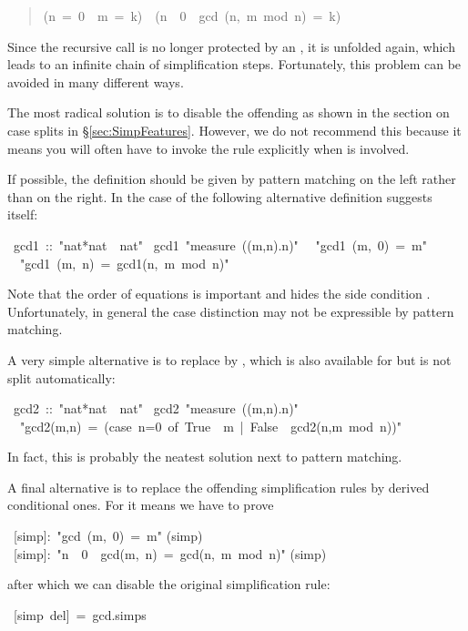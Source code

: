 \begin{isabelle}
\begin{isamarkuptext}
\begin{quote}
\begin{isabelle}%
(n\ =\ 0\ {\isasymlongrightarrow}\ m\ =\ k)\ {\isasymand}\ (n\ {\isasymnoteq}\ 0\ {\isasymlongrightarrow}\ gcd\ (n,\ m\ mod\ n)\ =\ k)
\end{isabelle}%

\end{quote}
Since the recursive call  is no longer protected by
an , it is unfolded again, which leads to an infinite chain of
simplification steps. Fortunately, this problem can be avoided in many
different ways.

The most radical solution is to disable the offending
 as shown in the section on case splits in
\S\ref{sec:SimpFeatures}.
However, we do not recommend this because it means you will often have to
invoke the rule explicitly when  is involved.

If possible, the definition should be given by pattern matching on the left
rather than  on the right. In the case of  the
following alternative definition suggests itself:%
\end{isamarkuptext}%
\ gcd1\ ::\ {"}nat*nat\ {\isasymRightarrow}\ nat{"}\isanewline
{}\ gcd1\ {"}measure\ ({\isasymlambda}(m,n).n){"}\isanewline
\ \ {"}gcd1\ (m,\ 0)\ =\ m{"}\isanewline
\ \ {"}gcd1\ (m,\ n)\ =\ gcd1(n,\ m\ mod\ n){"}%
\begin{isamarkuptext}%
\noindent
Note that the order of equations is important and hides the side condition
. Unfortunately, in general the case distinction
may not be expressible by pattern matching.

A very simple alternative is to replace  by , which
is also available for  but is not split automatically:%
\end{isamarkuptext}%
\ gcd2\ ::\ {"}nat*nat\ {\isasymRightarrow}\ nat{"}\isanewline
{}\ gcd2\ {"}measure\ ({\isasymlambda}(m,n).n){"}\isanewline
\ \ {"}gcd2(m,n)\ =\ (case\ n=0\ of\ True\ {\isasymRightarrow}\ m\ |\ False\ {\isasymRightarrow}\ gcd2(n,m\ mod\ n)){"}%
\begin{isamarkuptext}%
\noindent
In fact, this is probably the neatest solution next to pattern matching.

A final alternative is to replace the offending simplification rules by
derived conditional ones. For  it means we have to prove%
\end{isamarkuptext}%
\ [simp]:\ {"}gcd\ (m,\ 0)\ =\ m{"}\isanewline
{}(simp)\isanewline
{}\ [simp]:\ {"}n\ {\isasymnoteq}\ 0\ {\isasymLongrightarrow}\ gcd(m,\ n)\ =\ gcd(n,\ m\ mod\ n){"}\isanewline
{}(simp)%
\begin{isamarkuptext}%
\noindent
after which we can disable the original simplification rule:%
\end{isamarkuptext}%
\ [simp\ del]\ =\ gcd.simps\isanewline
\end{isabelle}%
